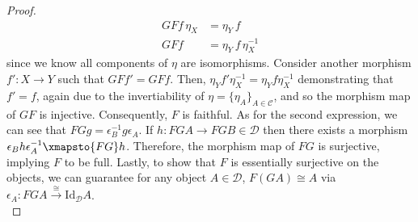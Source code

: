 \documentclass[ 12pt ]{article}
\begin{document}
\begin{enumerate}
\begin{enumerate}
\begin{proof}
\begin{align*}
					GF f\, \eta_X &= \eta_Y\, f \\
					GF f &= \eta_Y\, f\, \eta_X^{-1}
				\end{align*}
				since we know all components of $\eta$ are isomorphisms. Consider another morphism $f' : X \to Y$ such that $GF f' = GF f$. Then, $\eta_Y f' \eta_X^{-1} = \eta_Y f \eta_X^{-1}$ demonstrating that $f' = f$, again due to the invertiability of $\eta = \{ \eta_A \}_{A \in \mathscr{C}}$, and so the morphism map of $GF$ is injective. Consequently, $F$ is faithful. As for the second expression, we can see that $FG g = \epsilon_B^{-1} g \epsilon_A$. If $h : FG A \to FG B \in \mathscr{D}$ then there exists a morphism $\epsilon_B h \epsilon_A^{-1} \xmapsto{FG} h$. Therefore, the morphism map of $FG$ is surjective, implying $F$ to be full. Lastly, to show that $F$ is essentially surjective on the objects, we can guarantee for any object $A \in \mathscr{D}$, $F(GA) \cong A$ via $\epsilon_A : FGA \xrightarrow{\cong} \mathrm{Id}_\mathscr{D} A$. \\


\end{proof}
\end{enumerate}
\end{enumerate}
\end{document}
